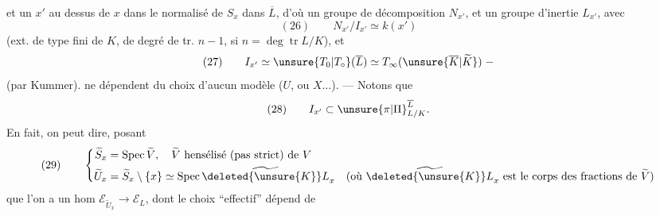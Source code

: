 \margin{Dans les\newline
considérations qui\newline
suivent, $K$ (et $X,U$)\newline
ne jouent provisoirement\newline
aucun rôle --- \unsure{(|[}Mais on pourrait\newline
``plus gén.'' \unsure{regarder|remplacer} groupes de décomp.\newline
\deleted{\unsure{de dimension relative}} d'un des ``$U$''\newline
\uline{mais seulement} \uline{\unsure{épis-comp|épi-s-comp|épi-scop}} (la ``généralisation'' étant\newline
triviale,\newline
$\mathcal E_L\longrightarrow\mathcal E_U$)}



et un $x'$ au dessus de $x$ dans le
normalisé de $S_x$ dans $\overline L$, d'où un
groupe de décomposition $N_{x'}$, et un
groupe d'inertie $L_{x'}$, avec
\[
(26)\qquad N_{x'}/I_{x'}\simeq k(x')
\]
(ext. de type fini de $K$, de degré de
tr. $n-1$, si $n=\deg\operatorname{tr}L/K$), et
\[
(27)\qquad I_{x'}\simeq\unsure{T_0|T_\circ}(\overline L)\simeq T_\infty(\unsure{\overline K|\widetilde K})\;-
\]
(par Kummer).  
ne dépendent du choix d'aucun
modèle ($U$, ou $X\ldots$). --- Notons que
\[
(28)\qquad I_{x'}\subset{\unsure{\pi|\Pi}}_{L/K}^{\overline L}.
\]
En fait, on peut dire, posant
\[
(29)\qquad\left\{\begin{aligned}
\widetilde S_x&=\operatorname{Spec}\widetilde V,\quad\widetilde V\text{ hensélisé (pas strict) de }V\\
\widetilde U_x&=\widetilde S_x\setminus\{x\}\simeq\operatorname{Spec}\widetilde{\deleted{\unsure{K}}L}_x\quad(\text{où }\widetilde{\deleted{\unsure{K}}L}_x\text{ est le corps des fractions de }\widetilde V)
\end{aligned}\right.
\]
que l'on a un hom  $\mathcal E_{\widetilde U_x}\longrightarrow\mathcal E_L$,
 dont le choix ``effectif'' dépend de

